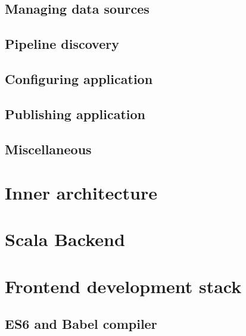 \subsection{Managing data sources}

\subsection{Pipeline discovery}

\subsection{Configuring application}

\subsection{Publishing application}

\subsection{Miscellaneous}



\section{Inner architecture}





\section{Scala Backend}






\section{Frontend development stack}

\subsection{ES6 and Babel compiler}

